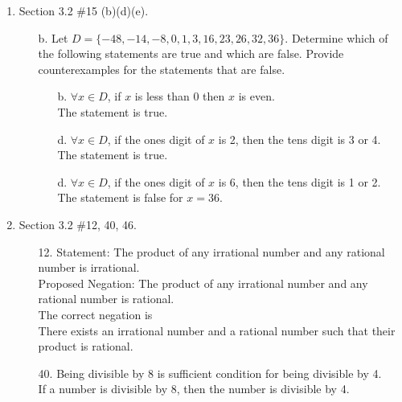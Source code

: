 \documentclass[12pt]{article}
\begin{document}
\begin{enumerate}
\begin{enumerate}
\begin{enumerate}
                    \end{enumerate}
                    
                
            \end{enumerate}
        \newpage
        \item Section 3.2 \#15 (b)(d)(e).
            \begin{enumerate}
                \item[b.]Let \( D = \{-48, -14, -8, 0, 1, 3, 16, 23, 26, 32, 36\} \). Determine which of the following statements are true and which are false. Provide counterexamples for the statements that are false.

                    \begin{enumerate}
                        \item[b.] \(\forall x \in D\), if \( x \) is less than 0 then \( x \) is even.\\
                        The statement is true.
                        \item[d.] \(\forall x \in D\), if the ones digit of \( x \) is 2, then the tens digit is 3 or 4.\\
                        The statement is true.
                        \item[d.] \(\forall x \in D\), if the ones digit of \( x \) is 6, then the tens digit is 1 or 2.\\
                        The statement is false for $x=36$.
                    \end{enumerate}
            \end{enumerate}
        \newpage
        \item Section 3.2 \#12, 40, 46.
            \begin{enumerate}
                \item[12.] Statement: The product of any irrational number and any rational number is irrational.\\
                        Proposed Negation: The product of any irrational number and any rational number is rational.\\
                        The correct negation is\\  
                        There exists an irrational number and a rational number such that their product is rational.\\

                \item[40.]Being divisible by 8 is sufficient condition for being divisible by 4.\\
                If a number is divisible by 8, then the number is divisible by 4. 


\end{enumerate}
\end{enumerate}
\end{document}
